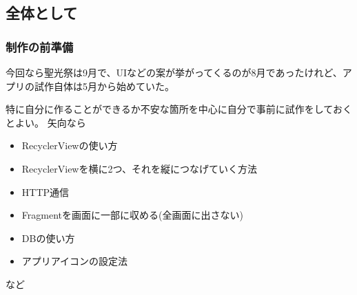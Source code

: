 \documentclass[dvipdfmx,jb5]{jarticle}
\begin{document}
 \subsection{全体として}
  \subsubsection{制作の前準備}
 今回なら聖光祭は9月で、UIなどの案が挙がってくるのが8月であったけれど、アプリの試作自体は5月から始めていた。\par
 特に自分に作ることができるか不安な箇所を中心に自分で事前に試作をしておくとよい。
 矢向なら
 \begin{itemize}
  \item RecyclerViewの使い方
  \item RecyclerViewを横に2つ、それを縦につなげていく方法
  \item HTTP通信
  \item Fragmentを画面に一部に収める(全画面に出さない)
  \item DBの使い方
  \item アプリアイコンの設定法
 \end{itemize}
 など
\end{document}
